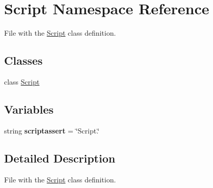 \hypertarget{namespaceScript}{\section{\-Script \-Namespace \-Reference}
\label{namespaceScript}
}


\-File with the \hyperlink{namespaceScript}{\-Script} class definition.  


\subsection*{\-Classes}
\begin{DoxyCompactItemize}
\item 
class \hyperlink{classScript_1_1Script}{\-Script}
\end{DoxyCompactItemize}
\subsection*{\-Variables}
\begin{DoxyCompactItemize}
\item 
\hypertarget{namespaceScript_a39acc8ebded1c4c225acea4ab18398b1}{string {\bfseries scriptassert} = \char`\"{}\-Script.\char`\"{}}\label{namespaceScript_a39acc8ebded1c4c225acea4ab18398b1}

\end{DoxyCompactItemize}


\subsection{\-Detailed \-Description}
\-File with the \hyperlink{namespaceScript}{\-Script} class definition. 